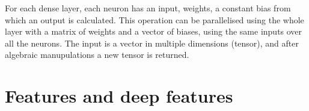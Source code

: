 For each dense layer, each neuron has an input, weights, a constant bias from which an output is calculated. This operation can be parallelised using the whole layer with a matrix of weights and a vector of biases, using the same inputs over all the neurons. The input is a vector in multiple dimensions (tensor), and after algebraic manupulations a new tensor is returned. 

\section{Features and deep features}




